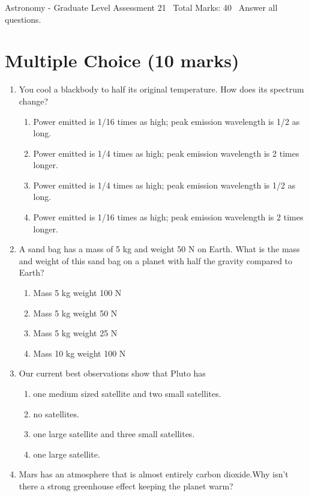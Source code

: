 \documentclass[12pt]{article}
\begin{document}
\begin{center}
Astronomy - Graduate Level Assessment 21 \
Total Marks: 40 \
Answer all questions.
\end{center}

\section*{Multiple Choice (10 marks)}
\begin{enumerate}[label=\arabic*.]
\item You cool a blackbody to half its original temperature. How does its spectrum change?
\begin{enumerate}[label=(\alph*)]
    \item Power emitted is 1/16 times as high; peak emission wavelength is 1/2 as long.
    \item Power emitted is 1/4 times as high; peak emission wavelength is 2 times longer.
    \item Power emitted is 1/4 times as high; peak emission wavelength is 1/2 as long.
    \item Power emitted is 1/16 times as high; peak emission wavelength is 2 times longer.
\end{enumerate}
\item A sand bag has a mass of 5 kg and weight 50 N on Earth. What is the mass and weight of this sand bag on a planet with half the gravity compared to Earth?
\begin{enumerate}[label=(\alph*)]
    \item Mass 5 kg weight 100 N
    \item Mass 5 kg weight 50 N
    \item Mass 5 kg weight 25 N
    \item Mass 10 kg weight 100 N
\end{enumerate}
\item Our current best observations show that Pluto has
\begin{enumerate}[label=(\alph*)]
    \item one medium sized satellite and two small satellites.
    \item no satellites.
    \item one large satellite and three small satellites.
    \item one large satellite.
\end{enumerate}
\item Mars has an atmosphere that is almost entirely carbon dioxide.Why isn't there a strong greenhouse effect keeping the planet warm?

\end{enumerate}
\end{document}
